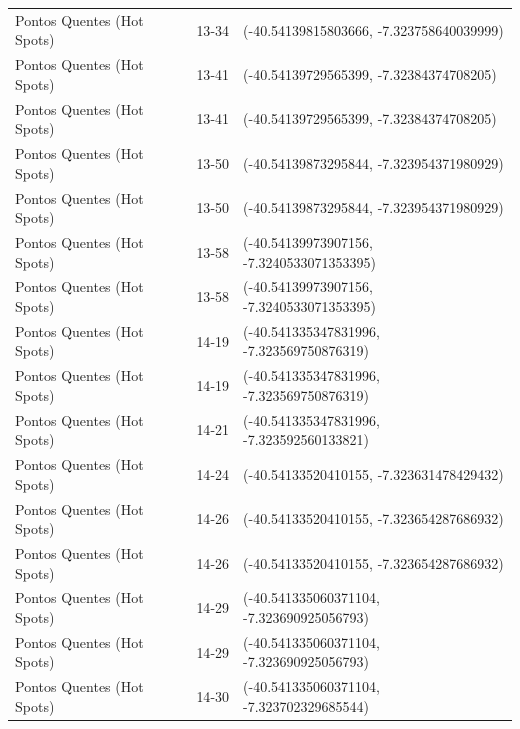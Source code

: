 \documentclass[dvipsnames]{article}%
\begin{document}
\begin{table}[h!]
\begin{tabular}{lll}
Pontos Quentes (Hot Spots)&13{-}34&({-}40.54139815803666, {-}7.323758640039999)\\%
Pontos Quentes (Hot Spots)&13{-}41&({-}40.54139729565399, {-}7.32384374708205)\\%
Pontos Quentes (Hot Spots)&13{-}41&({-}40.54139729565399, {-}7.32384374708205)\\%
Pontos Quentes (Hot Spots)&13{-}50&({-}40.54139873295844, {-}7.323954371980929)\\%
Pontos Quentes (Hot Spots)&13{-}50&({-}40.54139873295844, {-}7.323954371980929)\\%
Pontos Quentes (Hot Spots)&13{-}58&({-}40.54139973907156, {-}7.3240533071353395)\\%
Pontos Quentes (Hot Spots)&13{-}58&({-}40.54139973907156, {-}7.3240533071353395)\\%
Pontos Quentes (Hot Spots)&14{-}19&({-}40.541335347831996, {-}7.323569750876319)\\%
Pontos Quentes (Hot Spots)&14{-}19&({-}40.541335347831996, {-}7.323569750876319)\\%
Pontos Quentes (Hot Spots)&14{-}21&({-}40.541335347831996, {-}7.323592560133821)\\%
Pontos Quentes (Hot Spots)&14{-}24&({-}40.54133520410155, {-}7.323631478429432)\\%
Pontos Quentes (Hot Spots)&14{-}26&({-}40.54133520410155, {-}7.323654287686932)\\%
Pontos Quentes (Hot Spots)&14{-}26&({-}40.54133520410155, {-}7.323654287686932)\\%
Pontos Quentes (Hot Spots)&14{-}29&({-}40.541335060371104, {-}7.323690925056793)\\%
Pontos Quentes (Hot Spots)&14{-}29&({-}40.541335060371104, {-}7.323690925056793)\\%
Pontos Quentes (Hot Spots)&14{-}30&({-}40.541335060371104, {-}7.323702329685544)\\%
\bottomrule%
\end{tabular}%
\end{table}

%
\FloatBarrier%
\end{document}
